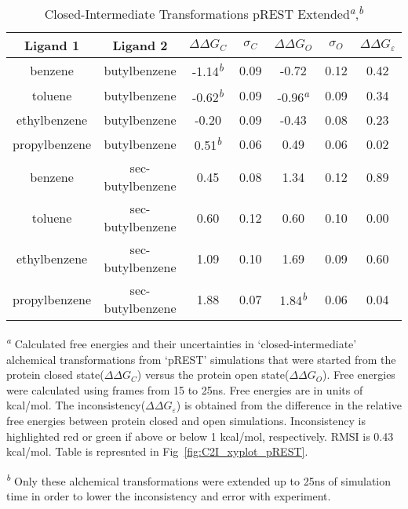 \begin{table}[!htb]
\centering
\caption{Closed-Intermediate Transformations pREST Extended\textsuperscript{\emph{a}},\textsuperscript{\emph{b}}}
\label{tbl:C-I_pRESText}
\begin{tabular}{|c|c|c|c|c|c|c|}
\hline
\textbf{Ligand 1}       & \textbf{Ligand 2}    & \boldmath$\Delta\Delta G_{C}$ & \boldmath$\sigma_{C}$ & \boldmath$\Delta\Delta G_{O}$ & \boldmath$\sigma_{O}$ & \boldmath$\Delta\Delta G_{\varepsilon}$ \\ \hline
benzene          & butylbenzene   & -1.14\textsuperscript{\emph{b}}    & 0.09  & -0.72   & 0.12  & \cellcolor[HTML]{9AFF99}0.42 \\ \hline
toluene          & butylbenzene   & -0.62\textsuperscript{\emph{b}}    & 0.09  & -0.96\textsuperscript{\emph{a}}  & 0.09  & \cellcolor[HTML]{9AFF99}0.34 \\ \hline
ethylbenzene     & butylbenzene   & -0.20     & 0.09  & -0.43   & 0.08  & \cellcolor[HTML]{9AFF99}0.23 \\ \hline
propylbenzene  & butylbenzene   & 0.51\textsuperscript{\emph{b}}     & 0.06  & 0.49    & 0.06  & \cellcolor[HTML]{9AFF99}0.02 \\ \hline
benzene          & sec-butylbenzene & 0.45      & 0.08  & 1.34    & 0.12  & \cellcolor[HTML]{9AFF99}0.89 \\ \hline
toluene          & sec-butylbenzene & 0.60      & 0.12  & 0.60    & 0.10  & \cellcolor[HTML]{9AFF99}0.00 \\ \hline
ethylbenzene     & sec-butylbenzene & 1.09      & 0.10  & 1.69    & 0.09  & \cellcolor[HTML]{9AFF99}0.60 \\ \hline
propylbenzene  & sec-butylbenzene & 1.88      & 0.07  & 1.84\textsuperscript{\emph{b}}   & 0.06  & \cellcolor[HTML]{9AFF99}0.04 \\ \hline
\end{tabular}
 
\textsuperscript{\emph{a}} Calculated free energies and their uncertainties in `closed-intermediate' alchemical transformations from `pREST' simulations that were started from the protein closed state(\boldmath$\Delta\Delta G_{C}$) versus the protein open state(\boldmath$\Delta\Delta G_{O}$).
Free energies were calculated using frames from 15 to 25ns. 
Free energies are in units of kcal/mol.
The inconsistency(\boldmath$\Delta\Delta G_{\varepsilon}$) is obtained from the difference in the relative free energies between protein closed and open simulations. 
Inconsistency is highlighted red or green if above or below 1 kcal/mol, respectively.
RMSI is 0.43 kcal/mol.
Table is represnted in Fig~\ref{fig:C2I_xyplot_pREST}.

\textsuperscript{\emph{b}} Only these alchemical transformations were extended up to 25ns of simulation time in order to lower the inconsistency and error with experiment.
\end{table}



